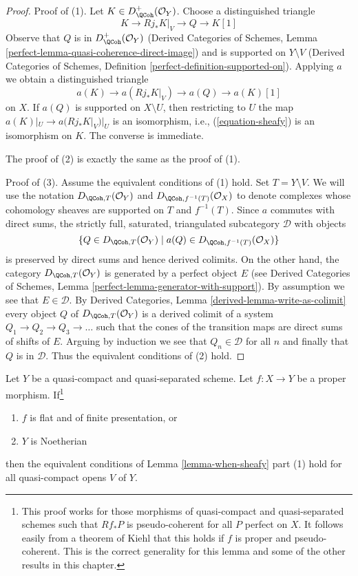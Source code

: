 \begin{proof}
Proof of (1). Let $K \in D_\QCoh^+(\mathcal{O}_Y)$.
Choose a distinguished triangle
$$
K \to Rj_*K|_V \to Q \to K[1]
$$
Observe that $Q$ is in $D_\QCoh^+(\mathcal{O}_Y)$
(Derived Categories of Schemes, Lemma
\ref{perfect-lemma-quasi-coherence-direct-image})
and is supported on $Y \setminus V$
(Derived Categories of Schemes, Definition
\ref{perfect-definition-supported-on}).
Applying $a$ we obtain a distinguished triangle
$$
a(K) \to a(Rj_*K|_V) \to a(Q) \to a(K)[1]
$$
on $X$. If $a(Q)$ is supported on $X \setminus U$, then
restricting to $U$ the map $a(K)|_U \to a(Rj_*K|_V)|_U$ is an
isomorphism, i.e., (\ref{equation-sheafy}) is an isomorphism on $K$.
The converse is immediate.

\medskip\noindent
The proof of (2) is exactly the same as the proof of (1).

\medskip\noindent
Proof of (3). Assume the equivalent conditions of (1) hold.
Set $T = Y \setminus V$.
We will use the notation $D_{\QCoh, T}(\mathcal{O}_Y)$ and
$D_{\QCoh, f^{-1}(T)}(\mathcal{O}_X)$ to denote complexes
whose cohomology sheaves are supported on $T$ and $f^{-1}(T)$.
Since $a$ commutes with direct sums, the strictly full, saturated, triangulated
subcategory $\mathcal{D}$ with objects
$$
\{Q \in D_{\QCoh, T}(\mathcal{O}_Y) \mid
a(Q) \in D_{\QCoh, f^{-1}(T)}(\mathcal{O}_X)\}
$$
is preserved by direct sums and hence derived colimits.
On the other hand, the category $D_{\QCoh, T}(\mathcal{O}_Y)$
is generated by a perfect object $E$
(see Derived Categories of Schemes, Lemma
\ref{perfect-lemma-generator-with-support}).
By assumption we see that $E \in \mathcal{D}$.
By Derived Categories, Lemma \ref{derived-lemma-write-as-colimit}
every object $Q$ of $D_{\QCoh, T}(\mathcal{O}_Y)$ is a derived
colimit of a system $Q_1 \to Q_2 \to Q_3 \to \ldots$
such that the cones of the transition maps are direct sums
of shifts of $E$. Arguing by induction we see that
$Q_n \in \mathcal{D}$ for all $n$ and finally that $Q$ is
in $\mathcal{D}$. Thus the equivalent conditions of (2) hold.
\end{proof}

\begin{lemma}
\label{lemma-proper-noetherian}
Let $Y$ be a quasi-compact and quasi-separated scheme.
Let $f : X \to Y$ be a proper morphism. If\footnote{This proof works for those
morphisms of quasi-compact and quasi-separated schemes such that
$Rf_*P$ is pseudo-coherent for all $P$ perfect on $X$. It follows
easily from a theorem of Kiehl \cite{Kiehl} that this holds if
$f$ is proper and pseudo-coherent. This is the correct generality
for this lemma and some of the other results in this chapter.}
\begin{enumerate}
\item $f$ is flat and of finite presentation, or
\item $Y$ is Noetherian
\end{enumerate}
then the equivalent conditions of Lemma \ref{lemma-when-sheafy} part (1)
hold for all quasi-compact opens $V$ of $Y$.
\end{lemma}

